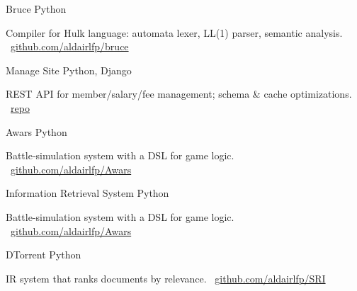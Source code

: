 \documentclass[]{awesome-cv}
\begin{document}
\begin{cventries}
	\vspace{-3mm}
	\cventry
	{}
	{Bruce \vspace{-5mm}}
	{Python \vspace{-5mm}}
	{}
	{\begin{cvsectionnormaltext}
			\item {Compiler for Hulk language: automata lexer, LL(1) parser, semantic analysis. \faLink\ \href{https://github.com/aldairlfp/bruce}{github.com/aldairlfp/bruce}
      }
		\end{cvsectionnormaltext}}

	\vspace{-3mm}
	\cventry
	{}
	{Manage Site \vspace{-5mm}}
	{Python, Django \vspace{-5mm}}
	{}
	{\begin{cvsectionnormaltext}
			\item{REST API for member/salary/fee management; schema \& cache optimizations. \faLink\ \href{https://github.com/aldairlfp}{repo}
      }
		\end{cvsectionnormaltext}}

	\vspace{-3mm}
	\cventry
	{}
	{Awars \vspace{-5mm}}
	{Python \vspace{-5mm}}
	{}
	{\begin{cvsectionnormaltext}
			\item{Battle‑simulation system with a DSL for game logic. \faLink\ \href{https://github.com/aldairlfp/Awars}{github.com/aldairlfp/Awars}
      }
		\end{cvsectionnormaltext}}

	\vspace{-3mm}
	\cventry
	{}
	{Information Retrieval System \vspace{-5mm}}
	{Python \vspace{-5mm}}
	{}
	{\begin{cvsectionnormaltext}
			\item{Battle-simulation system with a DSL for game logic. \faLink\ \href{https://github.com/aldairlfp/Awars}{github.com/aldairlfp/Awars}
      }
		\end{cvsectionnormaltext}}

	\vspace{-3mm}
	\cventry
	{}
	{DTorrent \vspace{-5mm}}
	{Python \vspace{-5mm}}
	{}
	{\begin{cvsectionnormaltext}
			\item{ IR system that ranks documents by relevance. \faLink\ \href{https://github.com/aldairlfp/SRI}{github.com/aldairlfp/SRI}
      }
		\end{cvsectionnormaltext}}


\end{cventries}
\end{document}
